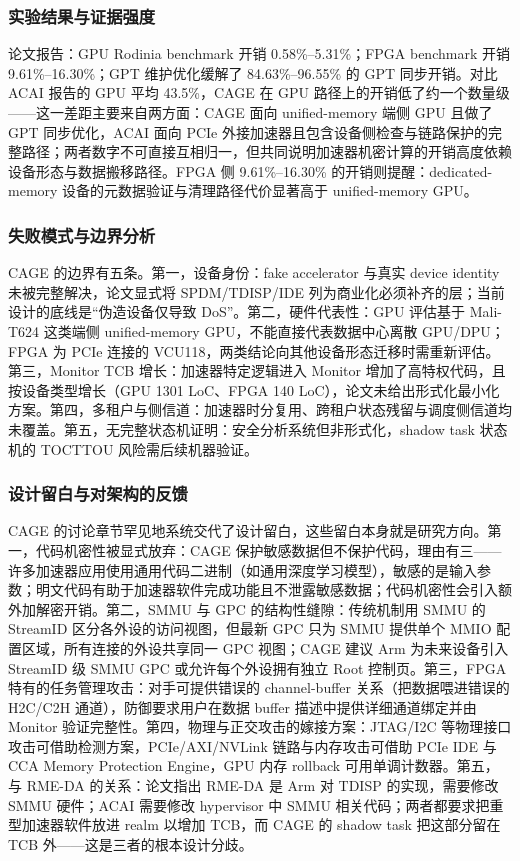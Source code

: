 \documentclass[11pt]{ctexart}
\begin{document}
\subsubsection{实验结果与证据强度}
论文报告：GPU Rodinia benchmark 开销 0.58\%--5.31\%；FPGA benchmark 开销 9.61\%--16.30\%；GPT 维护优化缓解了 84.63\%--96.55\% 的 GPT 同步开销。对比 ACAI 报告的 GPU 平均 43.5\%，CAGE 在 GPU 路径上的开销低了约一个数量级——这一差距主要来自两方面：CAGE 面向 unified-memory 端侧 GPU 且做了 GPT 同步优化，ACAI 面向 PCIe 外接加速器且包含设备侧检查与链路保护的完整路径；两者数字不可直接互相归一，但共同说明加速器机密计算的开销高度依赖设备形态与数据搬移路径。FPGA 侧 9.61\%--16.30\% 的开销则提醒：dedicated-memory 设备的元数据验证与清理路径代价显著高于 unified-memory GPU。\par
\subsubsection{失败模式与边界分析}
CAGE 的边界有五条。第一，设备身份：fake accelerator 与真实 device identity 未被完整解决，论文显式将 SPDM/TDISP/IDE 列为商业化必须补齐的层；当前设计的底线是“伪造设备仅导致 DoS”。第二，硬件代表性：GPU 评估基于 Mali-T624 这类端侧 unified-memory GPU，不能直接代表数据中心离散 GPU/DPU；FPGA 为 PCIe 连接的 VCU118，两类结论向其他设备形态迁移时需重新评估。第三，Monitor TCB 增长：加速器特定逻辑进入 Monitor 增加了高特权代码，且按设备类型增长（GPU 1301 LoC、FPGA 140 LoC），论文未给出形式化最小化方案。第四，多租户与侧信道：加速器时分复用、跨租户状态残留与调度侧信道均未覆盖。第五，无完整状态机证明：安全分析系统但非形式化，shadow task 状态机的 TOCTTOU 风险需后续机器验证。\par
\subsubsection{设计留白与对架构的反馈}
CAGE 的讨论章节罕见地系统交代了设计留白，这些留白本身就是研究方向。第一，代码机密性被显式放弃：CAGE 保护敏感数据但不保护代码，理由有三——许多加速器应用使用通用代码二进制（如通用深度学习模型），敏感的是输入参数；明文代码有助于加速器软件完成功能且不泄露敏感数据；代码机密性会引入额外加解密开销。第二，SMMU 与 GPC 的结构性缝隙：传统机制用 SMMU 的 StreamID 区分各外设的访问视图，但最新 GPC 只为 SMMU 提供单个 MMIO 配置区域，所有连接的外设共享同一 GPC 视图；CAGE 建议 Arm 为未来设备引入 StreamID 级 SMMU GPC 或允许每个外设拥有独立 Root 控制页。第三，FPGA 特有的任务管理攻击：对手可提供错误的 channel-buffer 关系（把数据喂进错误的 H2C/C2H 通道），防御要求用户在数据 buffer 描述中提供详细通道绑定并由 Monitor 验证完整性。第四，物理与正交攻击的嫁接方案：JTAG/I2C 等物理接口攻击可借助检测方案，PCIe/AXI/NVLink 链路与内存攻击可借助 PCIe IDE 与 CCA Memory Protection Engine，GPU 内存 rollback 可用单调计数器。第五，与 RME-DA 的关系：论文指出 RME-DA 是 Arm 对 TDISP 的实现，需要修改 SMMU 硬件；ACAI 需要修改 hypervisor 中 SMMU 相关代码；两者都要求把重型加速器软件放进 realm 以增加 TCB，而 CAGE 的 shadow task 把这部分留在 TCB 外——这是三者的根本设计分歧。\par
\end{document}
